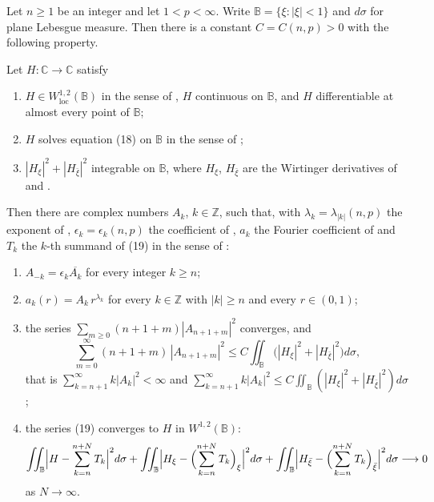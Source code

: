 \begin{theorem}
Let $n\ge1$ be an integer and let $1<p<\infty$.  Write
$\mathbb{B}=\{\xi:|\xi|<1\}$ and $d\sigma$ for plane Lebesgue measure.  Then
there is a constant $C=C(n,p)>0$ with the following property.

Let $H\colon\mathbb{C}\to\mathbb{C}$ satisfy
\begin{enumerate}
\item[(H1)] $H\in W^{1,2}_{\mathrm{loc}}(\mathbb{B})$ in the sense of
  , $H$ continuous on $\mathbb{B}$, and $H$ differentiable
  at almost every point of $\mathbb{B}$;
\item[(H2)] $H$ solves equation (18) on $\mathbb{B}$ in the sense of
  ;
\item[(H3)] $|H_\xi|^2+|H_{\bar\xi}|^2$ integrable on $\mathbb{B}$, where
  $H_\xi$, $H_{\bar\xi}$ are the Wirtinger derivatives of  and
  .
\end{enumerate}
Then there are complex numbers $A_k$, $k\in\mathbb{Z}$, such that, with
$\lambda_k=\lambda_{|k|}(n,p)$ the exponent of ,
$\epsilon_k=\epsilon_k(n,p)$ the coefficient of , $a_k$ the
Fourier coefficient of  and $T_k$ the $k$-th summand of
(19) in the sense of :
\begin{enumerate}
\item[(39)] $A_{-k}=\epsilon_k\overline{A_k}$ for every integer $k\ge n$;
\item[(b)] $a_k(r)=A_k\,r^{\lambda_k}$ for every $k\in\mathbb{Z}$ with
  $|k|\ge n$ and every $r\in(0,1)$;
\item[(22)] the series $\sum_{m\ge0}(n+1+m)|A_{n+1+m}|^2$ converges, and
\[
  \sum_{m=0}^{\infty}(n+1+m)\,|A_{n+1+m}|^2
  \le C\iint_{\mathbb{B}}\bigl(|H_\xi|^2+|H_{\bar\xi}|^2\bigr)d\sigma ,
\]
that is $\sum_{k=n+1}^{\infty}k|A_k|^2<\infty$ and
$\sum_{k=n+1}^{\infty}k|A_k|^2\le C\iint_{\mathbb{B}}(|H_\xi|^2+|H_{\bar\xi}|^2)d\sigma$;
\item[(19)] the series (19) converges to $H$ in $W^{1,2}(\mathbb{B})$:
\[
  \iint_{\mathbb{B}}\Bigl|H-\sum_{k=n}^{n+N}T_k\Bigr|^2d\sigma
  +\iint_{\mathbb{B}}\Bigl|H_\xi-\Bigl(\sum_{k=n}^{n+N}T_k\Bigr)_\xi\Bigr|^2d\sigma
  +\iint_{\mathbb{B}}\Bigl|H_{\bar\xi}
      -\Bigl(\sum_{k=n}^{n+N}T_k\Bigr)_{\bar\xi}\Bigr|^2d\sigma
  \longrightarrow0
\]
as $N\to\infty$.
\end{enumerate}


\end{theorem}
